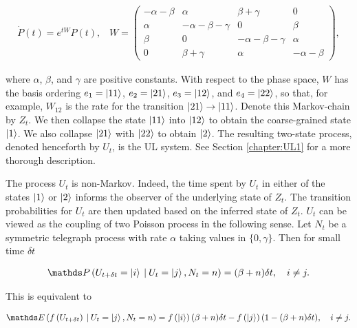  \begin{align}
\dot{P}(t) = e^{tW}P(t), \; \; \;  W = \begin{pmatrix} -\alpha - \beta & \alpha & \beta + \gamma & 0 \\
  \alpha & -\alpha -\beta -\gamma & 0 & \beta \\
  \beta & 0 & -\alpha-\beta-\gamma & \alpha \\
  0 & \beta+\gamma & \alpha & -\alpha-\beta\end{pmatrix},
\end{align}

where $\alpha$, $\beta$, and $\gamma$ are positive constants. With respect to the phase space, $W$ has the basis ordering $e_1 = \ket{11}$, $e_2 = \ket{21}$, $e_3 = \ket{12}$, and $e_4 = \ket{22}$, so that, for example, $W_{12}$ is the rate for the transition $\ket{21} \rightarrow \ket{11}$. Denote this Markov-chain by $Z_t$. We then collapse the state $\ket{11}$ into $\ket{12}$ to obtain the coarse-grained state $\ket{1}$. We also collapse $\ket{21}$ with $\ket{22}$ to obtain $\ket{2}$. The resulting two-state process, denoted henceforth by $U_t$, is the UL system. See Section \ref{chapter:UL1} for a more thorough description. 

The process $U_t$ is non-Markov. Indeed, the time spent by $U_t$ in either of the states $\ket{1}$ or $\ket{2}$ informs the observer of the underlying state of $Z_t$. The transition probabilities for $U_t$ are then updated based on the inferred state of $Z_t$. $U_t$ can be viewed as the coupling of two Poisson process in the following sense. Let $N_t$ be a symmetric telegraph process with rate $\alpha$ taking values in $ \{0,\gamma\}$. Then for small time $\delta t$

\begin{align}
\begin{split}
\bP\left(U_{t+\delta t} = \ket{i} \: \lvert \: U_t = \ket{j}, N_t = n  \right) = (\beta + n)\delta t, \quad i \neq j.
\end{split}
\end{align}


This is equivalent to 


\begin{align}
\begin{split}
\bE\left(f\left(U_{t+\delta t}\right)\: \lvert \: U_t = \ket{j}, N_t = n  \right) = f\left(\ket{i}\right)(\beta + n)\delta t - f\left(\ket{j}\right)(1 - (\beta + n)\delta t) , \quad i \neq j.
\end{split}
\end{align}

